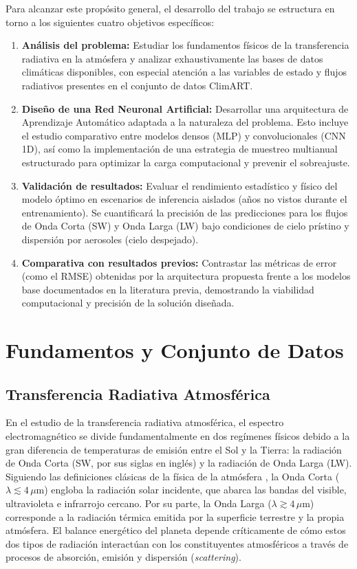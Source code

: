 \documentclass[11pt,a4paper,twoside,pdf]{article}
\numberwithin{equation}{section}
\begin{document}
Para alcanzar este propósito general, el desarrollo del trabajo se estructura en torno a los siguientes cuatro objetivos específicos:

\begin{enumerate}
    \item \textbf{Análisis del problema:} Estudiar los fundamentos físicos de la transferencia radiativa en la atmósfera y analizar exhaustivamente las bases de datos climáticas disponibles, con especial atención a las variables de estado y flujos radiativos presentes en el conjunto de datos ClimART.
    \item \textbf{Diseño de una Red Neuronal Artificial:} Desarrollar una arquitectura de Aprendizaje Automático adaptada a la naturaleza del problema. Esto incluye el estudio comparativo entre modelos densos (MLP) y convolucionales (CNN 1D), así como la implementación de una estrategia de muestreo multianual estructurado para optimizar la carga computacional y prevenir el sobreajuste.
    \item \textbf{Validación de resultados:} Evaluar el rendimiento estadístico y físico del modelo óptimo en escenarios de inferencia aislados (años no vistos durante el entrenamiento). Se cuantificará la precisión de las predicciones para los flujos de Onda Corta (SW) y Onda Larga (LW) bajo condiciones de cielo prístino y dispersión por aerosoles (cielo despejado).
    \item \textbf{Comparativa con resultados previos:} Contrastar las métricas de error (como el RMSE) obtenidas por la arquitectura propuesta frente a los modelos base documentados en la literatura previa, demostrando la viabilidad computacional y precisión de la solución diseñada.
\end{enumerate}


\section{Fundamentos y Conjunto de Datos}

\subsection{Transferencia Radiativa Atmosférica}

En el estudio de la transferencia radiativa atmosférica, el espectro electromagnético se divide fundamentalmente en dos regímenes físicos debido a la gran diferencia de temperaturas de emisión entre el Sol y la Tierra: la radiación de Onda Corta (SW, por sus siglas en inglés) y la radiación de Onda Larga (LW). Siguiendo las definiciones clásicas de la física de la atmósfera \cite{Wallace2006}, la Onda Corta ($\lambda \lesssim 4 \, \mu\text{m}$) engloba la radiación solar incidente, que abarca las bandas del visible, ultravioleta e infrarrojo cercano. Por su parte, la Onda Larga ($\lambda \gtrsim 4 \, \mu\text{m}$) corresponde a la radiación térmica emitida por la superficie terrestre y la propia atmósfera. El balance energético del planeta depende críticamente de cómo estos dos tipos de radiación interactúan con los constituyentes atmosféricos a través de procesos de absorción, emisión y dispersión (\textit{scattering}).
\end{document}
